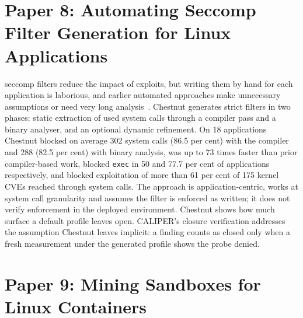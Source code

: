 \section{Paper 8: Automating Seccomp Filter Generation for Linux Applications}
\label{lit:chestnut}

 seccomp filters reduce the impact of exploits, but writing them by hand for each application is laborious, and earlier automated approaches make unnecessary assumptions or need very long analysis~\cite{chestnut}.
 Chestnut generates strict filters in two phases: static extraction of used system calls through a compiler pass and a binary analyser, and an optional dynamic refinement.
 On 18 applications Chestnut blocked on average 302 system calls (86.5 per cent) with the compiler and 288 (82.5 per cent) with binary analysis, was up to 73 times faster than prior compiler-based work, blocked \texttt{exec} in 50 and 77.7 per cent of applications respectively, and blocked exploitation of more than 61 per cent of 175 kernel CVEs reached through system calls.
 The approach is application-centric, works at system call granularity and assumes the filter is enforced as written; it does not verify enforcement in the deployed environment.
 Chestnut shows how much surface a default profile leaves open. CALIPER's closure verification addresses the assumption Chestnut leaves implicit: a finding counts as closed only when a fresh measurement under the generated profile shows the probe denied.

\section{Paper 9: Mining Sandboxes for Linux Containers}
\label{lit:mining}

